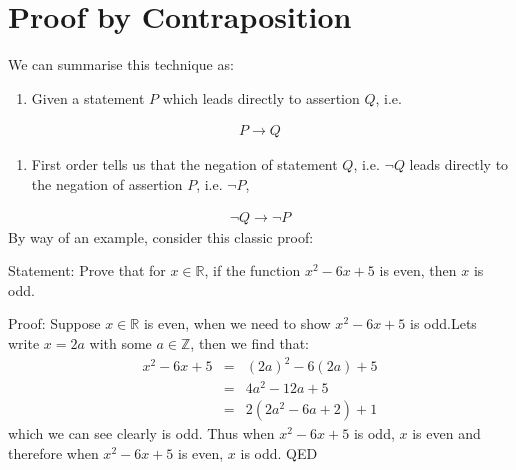 \documentclass[letterpaper,10pt,english]{jupyterBook}
\begin{document}
\section{Proof by Contraposition}
\label{\detokenize{ProofLogic/methodsofproof:proof-by-contraposition}}
\sphinxAtStartPar
We can summarise this technique as:
\begin{enumerate}
%
\item {} 
\sphinxAtStartPar
Given a statement \(P\) which leads directly to assertion \(Q\), i.e.

\end{enumerate}
\begin{equation*}
\begin{split}P \rightarrow Q \end{split}
\end{equation*}\begin{enumerate}
%
\item {} 
\sphinxAtStartPar
First order tells us that the negation of statement \(Q\), i.e. \(\neg Q\) leads directly to the negation of assertion \(P\), i.e. \(\neg P\),

\end{enumerate}
\begin{equation*}
\begin{split}\neg Q \rightarrow \neg P\end{split}
\end{equation*}
\sphinxAtStartPar
By way of an example, consider this classic proof:

\sphinxAtStartPar
Statement: Prove that for \(x \in \mathbb{R}\), if the function \(x^2 - 6x + 5\) is even, then \(x\) is odd.

\sphinxAtStartPar
Proof: Suppose \(x \in \mathbb{R}\) is even, when we need to show \(x^2 - 6x + 5\) is odd.Lets write \(x = 2a\) with some \(a \in \mathbb{Z}\), then we find that:
\begin{equation*}
\begin{split}x^2 - 6x + 5 &=& (2a)^2 - 6(2a) + 5 \\
&=& 4a^2 - 12a + 5 \\
&=& 2(2a^2 - 6a + 2) + 1\end{split}
\end{equation*}
\sphinxAtStartPar
which we can see clearly is odd.  Thus when \(x^2 - 6x + 5\) is odd, \(x\) is even and therefore when \(x^2 - 6x + 5\) is even, \(x\) is odd. QED
\end{document}
